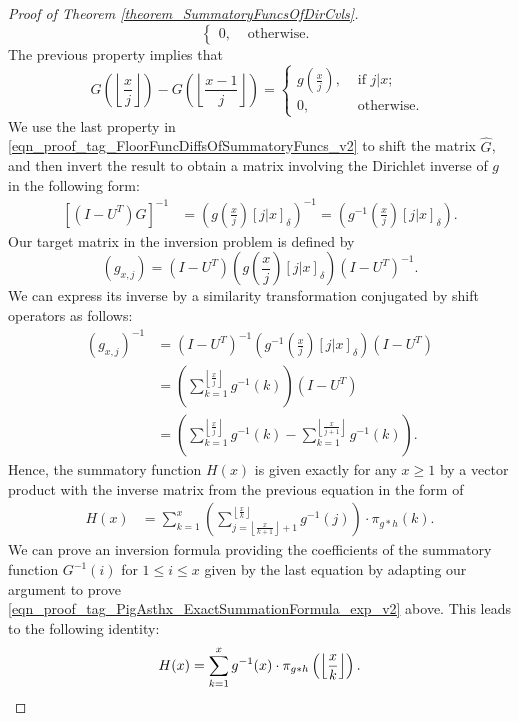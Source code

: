\documentclass[11pt,reqno,a4letter]{article}
\numberwithin{figure}{section}
\numberwithin{table}{section}
\newcommand{\Iverson}[1]{\ensuremath{\left[#1\right]_{\delta}}}
\newcommand{\floor}[1]{\left\lfloor #1 \right\rfloor}
\newcommand{\Floor}[2]{\ensuremath{\left\lfloor \frac{#1}{#2} \right\rfloor}}
\theoremstyle{plain}
\numberwithin{theorem}{section}
\theoremstyle{definition}
\begin{document}
\begin{proof}[Proof of Theorem \ref{theorem_SummatoryFuncsOfDirCvls}]
\[\begin{cases}
     0, & \text{ otherwise. } 
     \end{cases} 
\] 
The previous property implies that 
\begin{equation} 
\label{eqn_proof_tag_FloorFuncDiffsOfSummatoryFuncs_v2} 
G\left(\floor{\frac{x}{j}}\right) - G\left(\floor{\frac{x-1}{j}}\right) = 
     \begin{cases} 
     g\left(\frac{x}{j}\right), & \text{ if $j | x$; } \\ 
     0, & \text{ otherwise. } 
     \end{cases}
\end{equation} 
We use the last property in \eqref{eqn_proof_tag_FloorFuncDiffsOfSummatoryFuncs_v2} 
to shift the matrix $\hat{G}$, and then invert the result to obtain a matrix involving the 
Dirichlet inverse of $g$ in the following form: 
\begin{align*} 
\left[(I-U^{T}) \hat{G}\right]^{-1} & = \left(g\left(\frac{x}{j}\right) \Iverson{j|x}\right)^{-1} = 
     \left(g^{-1}\left(\frac{x}{j}\right) \Iverson{j|x}\right). 
\end{align*} 
Our target matrix in the inversion problem is defined by 
$$(g_{x,j}) = (I-U^{T}) \left(g\left(\frac{x}{j}\right) \Iverson{j|x}\right) (I-U^{T})^{-1}.$$
We can express its inverse by a similarity transformation conjugated by shift operators as follows: 
\begin{align*} 
(g_{x,j})^{-1} & = (I-U^{T})^{-1} \left(g^{-1}\left(\frac{x}{j}\right) \Iverson{j|x}\right) (I-U^{T}) \\ 
     & = \left(\sum_{k=1}^{\floor{\frac{x}{j}}} g^{-1}(k)\right) (I-U^{T}) \\ 
     & = \left(\sum_{k=1}^{\floor{\frac{x}{j}}} g^{-1}(k) - \sum_{k=1}^{\floor{\frac{x}{j+1}}} g^{-1}(k)\right). 
\end{align*} 
Hence, the summatory function $H(x)$ is given exactly for any $x \geq 1$ 
by a vector product with the inverse matrix from the previous equation in the form of 
\begin{align*} 
H(x) & = \sum_{k=1}^x \left(\sum_{j=\floor{\frac{x}{k+1}}+1}^{\floor{\frac{x}{k}}} g^{-1}(j)\right) 
     \cdot \pi_{g \ast h}(k). 
\end{align*} 
We can prove an inversion formula providing the coefficients of the summatory function 
$G^{-1}(i)$ for $1 \leq i \leq x$ given 
by the last equation by adapting our argument to prove 
\eqref{eqn_proof_tag_PigAsthx_ExactSummationFormula_exp_v2} above. 
This leads to the following identity: 
\[
H(x) = \sum_{k=1}^{x} g^{-1}(x) \cdot \pi_{g \ast h}\left(\Floor{x}{k}\right). 
     \qedhere 
\]
\end{proof} 
\end{document}
